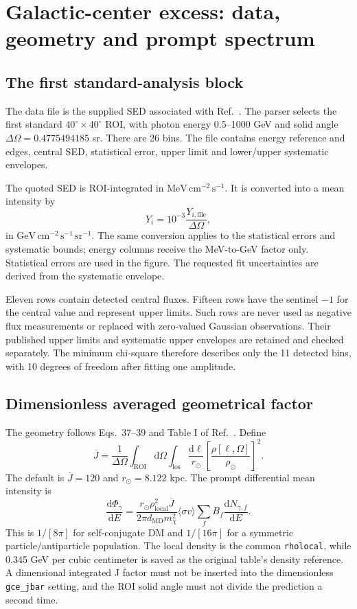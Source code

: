 \documentclass[11pt,a4paper]{article}
\newcommand{\sv}{\langle\sigma v\rangle}
\newcommand{\GeV}{\mathrm{GeV}}
\newcommand{\dd}{\mathrm{d}}
\begin{document}
\section{Galactic-center excess: data, geometry and prompt spectrum}
\subsection{The first standard-analysis block}
The data file is the supplied SED associated with Ref.~\cite{GCEData2026}. The parser selects the first standard $40^\circ\times40^\circ$ ROI, with photon energy 0.5--1000 GeV and solid angle $\Delta\Omega=0.4775494185$ sr. There are 26 bins. The file contains energy reference and edges, central SED, statistical error, upper limit and lower/upper systematic envelopes.

The quoted SED is ROI-integrated in $\mathrm{MeV}\,\mathrm{cm}^{-2}\,\mathrm{s}^{-1}$. It is converted into a mean intensity by
\begin{equation}
Y_i=10^{-3}\frac{Y_{i,\mathrm{file}}}{\Delta\Omega},
\end{equation}
in $\GeV\,\mathrm{cm}^{-2}\,\mathrm{s}^{-1}\,\mathrm{sr}^{-1}$. The same conversion applies to the statistical errors and systematic bounds; energy columns receive the MeV-to-GeV factor only. Statistical errors are used in the figure. The requested fit uncertainties are derived from the systematic envelope.

Eleven rows contain detected central fluxes. Fifteen rows have the sentinel $-1$ for the central value and represent upper limits. Such rows are never used as negative flux measurements or replaced with zero-valued Gaussian observations. Their published upper limits and systematic upper envelopes are retained and checked separately. The minimum chi-square therefore describes only the 11 detected bins, with 10 degrees of freedom after fitting one amplitude.

\subsection{Dimensionless averaged geometrical factor}
The geometry follows Eqs.~37--39 and Table I of Ref.~\cite{GCEGeometry2025}. Define
\begin{equation}
\overline J=\frac{1}{\Delta\Omega}\int_{\mathrm{ROI}}\dd\Omega
\int_{\mathrm{los}}\frac{\dd\ell}{r_\odot}
\left[\frac{\rho[\ell,\Omega]}{\rho_\odot}\right]^2.
\end{equation}
The default is $\overline J=120$ and $r_\odot=8.122$ kpc. The prompt differential mean intensity is
\begin{equation}
\frac{\dd\Phi_\gamma}{\dd E}=\frac{r_\odot\rho_{\mathrm{local}}^2\overline J}{2\pi d_{\mathrm{MD}}m_\chi^2}
\sv\sum_f B_f\frac{\dd N_{\gamma,f}}{\dd E}.
\end{equation}
This is $1/[8\pi]$ for self-conjugate DM and $1/[16\pi]$ for a symmetric particle/antiparticle population. The local density is the common \texttt{rholocal}, while 0.345 GeV per cubic centimeter is saved as the original table's density reference. A dimensional integrated J factor must not be inserted into the dimensionless \texttt{gce\_jbar} setting, and the ROI solid angle must not divide the prediction a second time.
\end{document}
